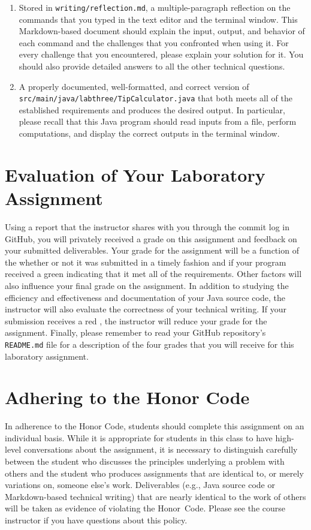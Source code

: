 \documentclass[11pt]{article}
\newcommand{\mainprogramsource}{\lstinline{src/main/java/labthree/TipCalculator.java}}
\newcommand{\reflection}{\lstinline{writing/reflection.md}}
\newcommand{\program}[1]{\lstinline{#1}}
\newcommand{\checkmark}{\ding{51}}
\newcommand{\naughtmark}{\ding{55}}
\begin{document}
\begin{enumerate}

  \setlength{\itemsep}{0in}

\item Stored in \reflection{}, a multiple-paragraph reflection on the commands
  that you typed in the text editor and the terminal window. This Markdown-based
  document should explain the input, output, and behavior of each command and
  the challenges that you confronted when using it. For every challenge that you
  encountered, please explain your solution for it. You should also provide
  detailed answers to all the other technical questions.

\item A properly documented, well-formatted, and correct version of
  \mainprogramsource{} that both meets all of the established requirements and
  produces the desired output. In particular, please recall that this Java
  program should read inputs from a file, perform computations, and display the
  correct outputs in the terminal window.

\end{enumerate}

\section*{Evaluation of Your Laboratory Assignment}

Using a report that the instructor shares with you through the commit log in
GitHub, you will privately received a grade on this assignment and feedback on
your submitted deliverables. Your grade for the assignment will be a function of
the whether or not it was submitted in a timely fashion and if your program
received a green \checkmark{} indicating that it met all of the requirements.
Other factors will also influence your final grade on the assignment. In
addition to studying the efficiency and effectiveness and documentation of your
Java source code, the instructor will also evaluate the correctness of your
technical writing. If your submission receives a red \naughtmark{}, the
instructor will reduce your grade for the assignment. Finally, please remember
to read your GitHub repository's \program{README.md} file for a description of
the four grades that you will receive for this laboratory assignment.

\section*{Adhering to the Honor Code}

In adherence to the Honor Code, students should complete this assignment on an
individual basis. While it is appropriate for students in this class to have
high-level conversations about the assignment, it is necessary to distinguish
carefully between the student who discusses the principles underlying a problem
with others and the student who produces assignments that are identical to, or
merely variations on, someone else's work. Deliverables (e.g., Java source code
or Markdown-based technical writing) that are nearly identical to the work of
others will be taken as evidence of violating the \mbox{Honor Code}. Please see
the course instructor if you have questions about this policy.
\end{document}
